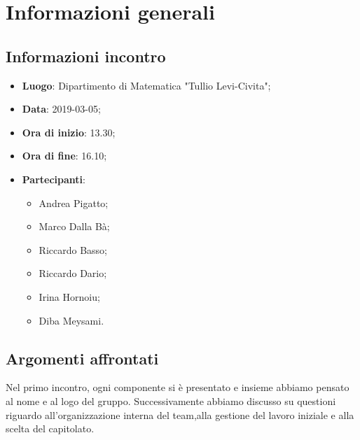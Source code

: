 \section{Informazioni generali}

\subsection{Informazioni incontro}
\begin{itemize}
\item \textbf{Luogo}: Dipartimento di Matematica "Tullio Levi-Civita";
\item \textbf{Data}: 2019-03-05;
\item \textbf{Ora di inizio}: 13.30;
\item \textbf{Ora di fine}: 16.10;
\item \textbf{Partecipanti}: 
\begin{itemize}
	\item Andrea Pigatto;
	\item Marco Dalla Bà;
	\item Riccardo Basso;
	\item Riccardo Dario;
	\item Irina Hornoiu;
	\item Diba Meysami.
\end{itemize}
\end{itemize}

\subsection{Argomenti affrontati}
Nel primo incontro, ogni componente si è presentato e insieme abbiamo pensato al nome e al logo del gruppo. 
Successivamente abbiamo discusso su questioni riguardo all'organizzazione interna del team,alla gestione del lavoro iniziale e alla scelta del 
capitolato\glo.
